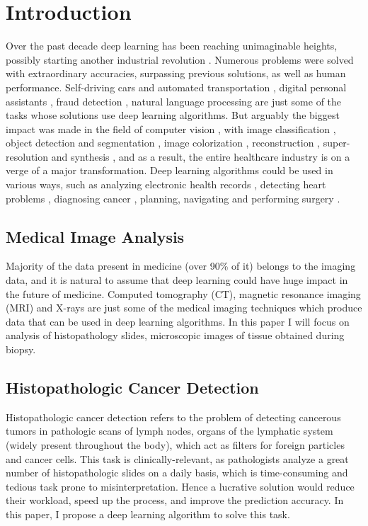 \chapter{Introduction}
\label{ch:intro}

Over the past decade deep learning has been reaching unimaginable heights, possibly starting another industrial revolution \cite{ml_revolution}. Numerous problems were solved with extraordinary accuracies, surpassing previous solutions, as well as human performance. Self-driving cars \cite{bojarski2016end} and automated transportation \cite{nguyen2018deep}, digital personal assistants \cite{polyakov2018investigation}, fraud detection \cite{perols2011financial}, natural language processing \cite{young2018recent} are just some of the tasks whose solutions use deep learning algorithms. But arguably the biggest impact was made in the field of computer vision \cite{voulodimos2018deep}, with image classification \cite{rawat2017deep}, object detection  and segmentation \cite{zhao2019object}, image colorization \cite{zhang2016colorful}, reconstruction \cite{wang2018image}, super-resolution \cite{dong2014learning} and synthesis \cite{reed2016generative}, and as a result, the entire healthcare industry is on a verge of a major transformation. Deep learning algorithms could be used in various ways, such as analyzing electronic health records \cite{rajkomar2018scalable}, detecting heart problems \cite{poplin2018prediction}, diagnosing cancer \cite{fakoor2013using}, planning, navigating and performing surgery \cite{shvets2018automatic}.

\section{Medical Image Analysis}

Majority of the data present in medicine (over 90\% of it) belongs to the imaging data, and it is natural to assume that deep learning could have huge impact in the future of medicine. Computed tomography (CT), magnetic resonance imaging (MRI) and X-rays are just some of the medical imaging techniques which produce data that can be used in deep learning algorithms. In this paper I will focus on analysis of histopathology slides, microscopic images of tissue obtained during biopsy.

\section{Histopathologic Cancer Detection}
Histopathologic cancer detection refers to the problem of detecting cancerous tumors in pathologic scans of lymph nodes, organs of the lymphatic system (widely present throughout the body), which act as filters for foreign particles and cancer cells. This task is clinically-relevant, as pathologists analyze a great number of histopathologic slides on a daily basis, which is time-consuming and tedious task prone to misinterpretation. Hence a lucrative solution would reduce their workload, speed up the process, and improve the prediction accuracy. In this paper, I propose a deep learning algorithm to solve this task.

